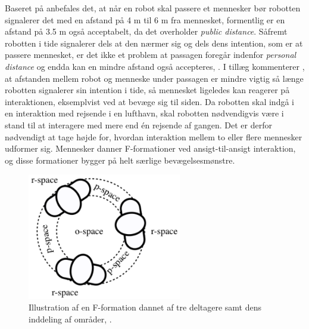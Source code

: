 Baseret på \textcite[ss. 169-170]{PDF:HumanRobotEmodiedInteraction} anbefales det, at når en robot skal passere et mennesker bør robotten signalerer det med en afstand på 4 m til 6 m fra mennesket, formentlig er en afstand på 3.5 m også acceptabelt, da det overholder \textit{public distance}. Såfremt robotten i tide signalerer dels at den nærmer sig og dels dens intention, som er at passere mennesket, er det ikke et problem at passagen foregår indenfor \textit{personal distance} og endda kan en mindre afstand også accepteres, \parencite[s. 170]{PDF:HumanRobotEmodiedInteraction}. I tillæg kommenterer \textcite[s. 170]{PDF:HumanRobotEmodiedInteraction}, at afstanden mellem robot og menneske under passagen er mindre vigtig så længe robotten signalerer sin intention i tide, så mennesket ligeledes kan reagerer på interaktionen, eksemplvist ved at bevæge sig til siden.\blankline
%
Da robotten skal indgå i en interaktion med rejsende i en lufthavn, skal robotten nødvendigvis være i stand til at interagere med mere end én rejsende af gangen. Det er derfor nødvendigt at tage højde for, hvordan interaktion mellem to eller flere mennesker udformer sig. Mennesker danner F-formationer ved ansigt-til-ansigt interaktion, \parencite[s. 445]{PDF:UsingFFormations} og disse formationer bygger på helt særlige bevægelsesmønstre.
%
\begin{figure}[H]
\centering
\includegraphics[width = 0.60\textwidth]{Figure/F-Formation} 
\caption{Illustration af en F-formation dannet af tre deltagere samt dens inddeling af områder, \parencite[s. 446]{PDF:UsingFFormations}.}
\label{fig:F-Formation}
\end{figure}
\noindent 
%
